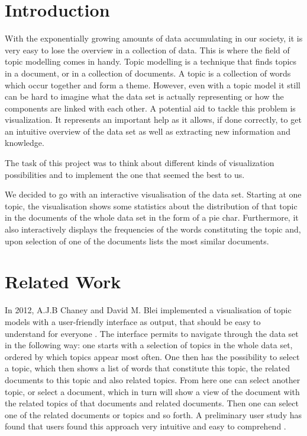 \documentclass[11pt]{article}
\title{\xxx{Visualization and usage of Topic Modelling \\ \Large{(MICS2-13 -- Knowledge Discovery and Data Mining)}}}  %
\author{Keller Patrick, Meder Jeff, Olszewski Maya}    %
\date{\today}   %
\begin{document}
\maketitle

%
\section{Introduction}
%

With the exponentially growing amounts of data accumulating in our society, it is very easy to lose the overview in a collection of data. This is where the field of topic modelling comes in handy. Topic modelling is a technique that finds topics in a document, or in a collection of documents. A topic is a collection of words which occur together and form a theme.  However, even with a topic model it still can be hard to imagine what the data set is actually representing or how the components are linked with each other. A potential aid to tackle this problem is visualization. It represents an important help as it allows, if done correctly, to get an intuitive overview of the data set as well as extracting new information and knowledge.

The task of this project was to think about different kinds of visualization possibilities and to implement the one that seemed the best to us.

We decided to go with an interactive visualisation of the data set. Starting at one topic, the visualisation shows some statistics about the distribution of that topic in the documents of the whole data set in the form of a pie char. Furthermore, it also interactively displays the frequencies of the words constituting the topic and, upon selection of one of the documents lists the most similar documents.

\section{Related Work}
%

In 2012, A.J.B Chaney and David M. Blei implemented a visualisation of topic models with a user-friendly interface as output, that should be easy to understand for everyone \cite{Chaney2012VisualizingTM}. The interface permits to navigate through the data set in the following way: one starts with a selection of topics in the whole data set, ordered by which topics appear most often. One then has the possibility to select a topic, which then shows a list of words that constitute this topic, the related documents to this topic and also related topics. From here one can select another topic, or select a document, which in turn will show a view of the document with the related topics of that documents and related documents. Then one can select one of the related documents or topics and so forth. A preliminary user study has found that users found this approach very intuitive and easy to comprehend \cite{Chaney2012VisualizingTM}.
\end{document}
